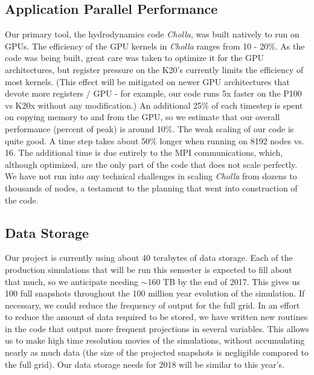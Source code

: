 \documentclass[11pt,letterpaper,english]{article}
\begin{document}
\subsection{Application Parallel Performance} 

Our primary tool, the hydrodynamics code \textit{Cholla}, was built natively to run on GPUs. The efficiency of the GPU kernels in \textit{Cholla} ranges from 10 - 20\%. As the code was being built, great care was taken to optimize it for the GPU architectures, but register pressure on the K20's currently limits the efficiency of most kernels. (This effect will be mitigated on newer GPU architectures that devote more registers / GPU - for example, our code runs 5x faster on the P100 vs K20x without any modification.) An additional 25\% of each timestep is spent on copying memory to and from the GPU, so we estimate that our overall performance (percent of peak) is around 10\%. The weak scaling of our code is quite good. A time step takes about 50\% longer when running on 8192 nodes vs. 16. The additional time is due entirely to the MPI communications, which, although optimized, are the only part of the code that does not scale perfectly. We have not run into any technical challenges in scaling \textit{Cholla} from dozens to thousands of nodes, a testament to the planning that went into construction of the code.


\subsection{Data Storage} 

Our project is currently using about 40 terabytes of data storage. Each of the production simulations that will be run this semester is expected to fill about that much, so we anticipate needing $\sim$160 TB by the end of 2017. This gives us 100 full snapshots throughout the 100 million year evolution of the simulation. If necessary, we could reduce the frequency of output for the full grid. In an effort to reduce the amount of data required to be stored, we have written new routines in the code that output more frequent projections in several variables. This allows us to make high time resolution movies of the simulations, without accumulating nearly as much data (the size of the projected snapshots is negligible compared to the full grid). Our data storage needs for 2018 will be similar to this year's.
\end{document}
